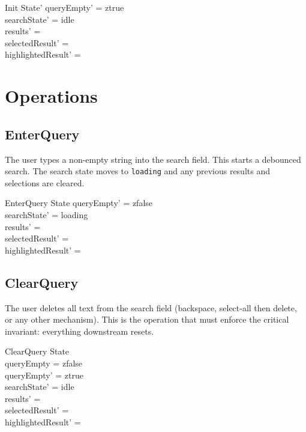 \documentclass[a4paper,10pt,fleqn]{article}
\begin{document}
\begin{schema}{Init}
  State'
  \where
  queryEmpty' = ztrue \\
  searchState' = idle \\
  results' = \emptyset \\
  selectedResult' = \emptyset \\
  highlightedResult' = \emptyset
\end{schema}

\section{Operations}

\subsection{EnterQuery}

The user types a non-empty string into the search field. This starts a
debounced search. The search state moves to \texttt{loading} and any
previous results and selections are cleared.

\begin{schema}{EnterQuery}
  \Delta State
  \where
  queryEmpty' = zfalse \\
  searchState' = loading \\
  results' = \emptyset \\
  selectedResult' = \emptyset \\
  highlightedResult' = \emptyset
\end{schema}

\subsection{ClearQuery}

The user deletes all text from the search field (backspace, select-all
then delete, or any other mechanism). This is the operation that must
enforce the critical invariant: everything downstream resets.

\begin{schema}{ClearQuery}
  \Delta State \\
  \where
  queryEmpty = zfalse \\
  queryEmpty' = ztrue \\
  searchState' = idle \\
  results' = \emptyset \\
  selectedResult' = \emptyset \\
  highlightedResult' = \emptyset
\end{schema}
\end{document}
